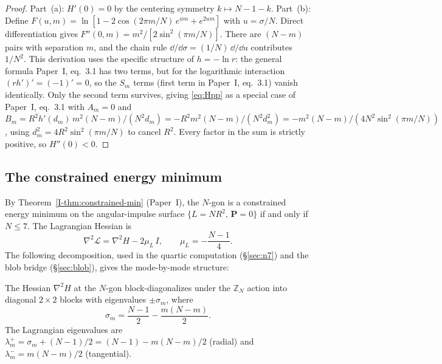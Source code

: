 \begin{proof}
Part~(a): $H'(0) = 0$ by the centering symmetry $k \mapsto N-1-k$.
Part~(b): Define $F(u, m) = \ln[1 - 2\cos(2\pi m/N)\,e^{um} + e^{2um}]$
with $u = \sigma/N$.  Direct differentiation gives
$F''(0, m) = m^2/[2\sin^2(\pi m/N)]$.
There are $(N-m)$ pairs with separation $m$, and the chain rule
$\dd/\dd\sigma = (1/N)\,\dd/\dd u$ contributes $1/N^2$.
This derivation uses the specific structure of $h = -\ln r$:
the general formula Paper~I, eq.~3.1 has two terms, but for the
logarithmic interaction $(rh')' = (-1)' = 0$, so the $S_m$ terms
(first term in Paper~I, eq.~3.1) vanish identically.  Only the
second term survives, giving \eqref{eq:Hpp} as a special case of
Paper~I, eq.~3.1 with $A_m = 0$ and
$B_m = R^2 h'(d_m)\,m^2(N{-}m)/(N^2 d_m)
= -R^2 m^2(N{-}m)/(N^2 d_m^2)
= -m^2(N{-}m)/(4N^2 \sin^2(\pi m/N))$,
using $d_m^2 = 4R^2\sin^2(\pi m/N)$ to cancel $R^2$.
Every factor in the sum is strictly positive, so $H''(0) < 0$.
\end{proof}

\subsection{The constrained energy minimum}

By Theorem~\ref*{I-thm:constrained-min} (Paper~I), the
$N$-gon is a constrained energy minimum on the angular-impulse
surface $\{L = NR^2,\, \mathbf{P} = 0\}$ if and only if
$N \le 7$.
The Lagrangian Hessian is
\begin{equation}\label{eq:lagr-hess}
  \nabla^2\!\mathcal{L} = \nabla^2 H - 2\mu_L\, I,
  \qquad \mu_L = -\frac{N-1}{4}.
\end{equation}
The following decomposition, used in the quartic computation
(\S\ref{sec:n7}) and the blob bridge (\S\ref{sec:blob}),
gives the mode-by-mode structure:

\begin{proposition}\label{prop:hessian-blocks}
The Hessian $\nabla^2\!H$ at the $N$-gon block-diagonalizes
under the $\mathbb{Z}_N$ action into diagonal $2 \times 2$
blocks with eigenvalues $\pm\sigma_m$, where
\begin{equation}\label{eq:sigma-m}
  \sigma_m = \frac{N-1}{2} - \frac{m(N-m)}{2}.
\end{equation}
The Lagrangian eigenvalues are
$\lambda_m^+ = \sigma_m + (N{-}1)/2 = (N{-}1) - m(N{-}m)/2$
(radial) and $\lambda_m^- = m(N{-}m)/2$ (tangential).
\end{proposition}

